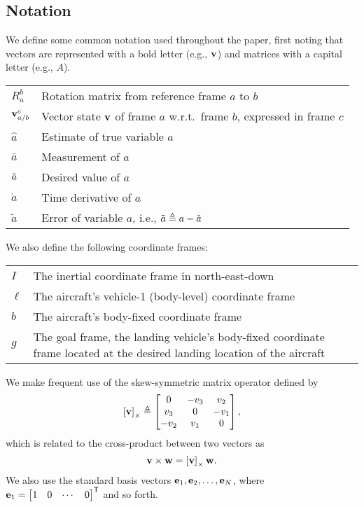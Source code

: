 
\subsection{Notation}

We define some common notation used throughout the paper, first noting that
vectors are represented with a bold letter (e.g., $\bf v$) and matrices with a
capital letter (e.g., $A$).
\begin{center}
\begin{tabularx}{\columnwidth}{lX}
$R_a^b$ & Rotation matrix from reference frame $a$ to $b$ \\
$\boldsymbol{\mathrm{v}}_{a/b}^c$ & Vector state $\boldsymbol{\mathrm{v}}$ of frame $a$ w.r.t.~frame $b$, expressed in frame $c$ \\
$\hat{a}$ & Estimate of true variable $a$ \\
$\bar{a}$ & Measurement of $a$ \\
$\check{a}$ & Desired value of $a$ \\
$\dot{a}$ & Time derivative of $a$ \\
$\tilde{a}$ & Error of variable $a$, i.e., $\tilde{a} \triangleq a - \check{a}$
\end{tabularx}
\end{center}
%
We also define the following coordinate frames:
\begin{center}
\begin{tabularx}{\columnwidth}{lX}
$I$ & The inertial coordinate frame in north-east-down\\
$\ell$ & The aircraft's vehicle-1 (body-level) coordinate frame \\
$b$ & The aircraft's body-fixed coordinate frame \\
$g$ & The goal frame, the landing vehicle's body-fixed coordinate frame located at the desired landing location of the aircraft
\end{tabularx}
\end{center}

We make frequent use of the skew-symmetric matrix operator defined by
\begin{equation}
  \left[ \boldsymbol{\mathrm{v}} \right]_{\times} \triangleq
  \begin{bmatrix}
  0 & -v_{3} & v_{2}\\
  v_{3} & 0 & -v_{1}\\
  -v_{2} & v_{1} & 0
  \end{bmatrix},
\end{equation}
which is related to the cross-product between two vectors as
\begin{equation}
  \boldsymbol{\mathrm{v}}\times\boldsymbol{\mathrm{w}}=\left[ \boldsymbol{\mathrm{v}} \right]_{\times}\boldsymbol{\mathrm{w}}.
\end{equation}
We also use the standard basis vectors $\boldsymbol{\mathrm{e}}_1, \boldsymbol{\mathrm{e}}_2, \ldots, \boldsymbol{\mathrm{e}}_N$, where $\boldsymbol{\mathrm{e}}_1 = \begin{bmatrix} 1 & 0 & \cdots & 0 \end{bmatrix}^{\mathsf{T}}$ and so forth.
